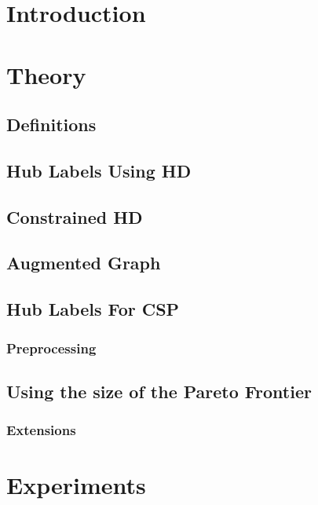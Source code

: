 \documentclass{vldb}
\begin{document}
\section{Introduction}


\section{Theory}
\subsection{Definitions}


\subsection{Hub Labels Using HD}


\subsection{Constrained HD}


\subsection{Augmented Graph}


\subsection{Hub Labels For CSP}


\subsubsection{Preprocessing}


\subsection{Using the size of the Pareto Frontier}


\subsubsection{Extensions}


\section{Experiments}

\end{document}
